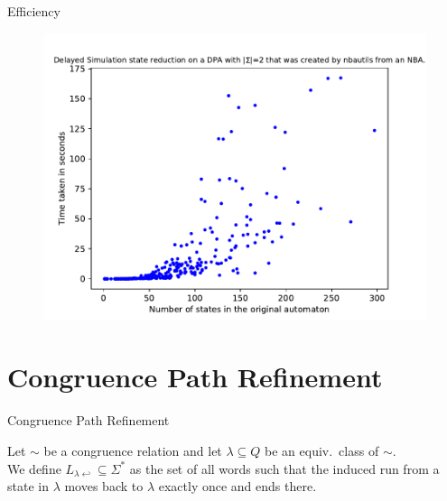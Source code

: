 \begin{frame}{Efficiency}
\begin{figure}
	\centering
	\includegraphics[page=6,height=.8\textheight]{../data/analysis/fritzwilke/detnbaut_ap1.pdf} 
\end{figure}
\end{frame}







\section{Congruence Path Refinement}
\begin{frame}{Congruence Path Refinement}
	\begin{defn}
	Let $\sim$ be a congruence relation and let $\lambda \subseteq Q$ be an equiv.\ class of $\sim$. \\
	We define $L_{\lambda \hookleftarrow} \subseteq \Sigma^*$ as the set of all words such that the induced run from a state in $\lambda$ moves back to $\lambda$ exactly once and ends there. 
	\end{defn}
\end{frame}	

